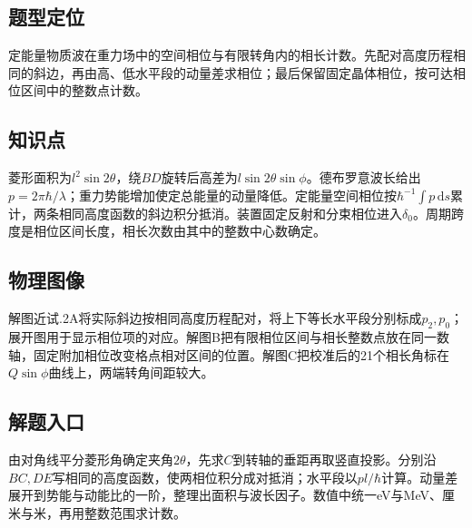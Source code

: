 \documentclass[UTF8,fontset=fandol,a4paper,11pt]{ctexart}
\begin{document}


\subsection*{题型定位}

定能量物质波在重力场中的空间相位与有限转角内的相长计数。先配对高度历程相同的斜边，再由高、低水平段的动量差求相位；最后保留固定晶体相位，按可达相位区间中的整数点计数。



\subsection*{知识点}

菱形面积为$l^2\sin2\theta$，绕$BD$旋转后高差为$l\sin2\theta\sin\phi$。德布罗意波长给出$p=2\pi\hbar/\lambda$；重力势能增加使定总能量的动量降低。定能量空间相位按$\hbar^{-1}\int p\,\mathrm ds$累计，两条相同高度函数的斜边积分抵消。装置固定反射和分束相位进入$\delta_0$。周期跨度是相位区间长度，相长次数由其中的整数中心数确定。



\subsection*{物理图像}

解图近试.2A将实际斜边按相同高度历程配对，将上下等长水平段分别标成$p_2,p_0$；展开图用于显示相位项的对应。解图B把有限相位区间与相长整数点放在同一数轴，固定附加相位改变格点相对区间的位置。解图C把校准后的21个相长角标在$Q\sin\phi$曲线上，两端转角间距较大。



\subsection*{解题入口}

由对角线平分菱形角确定夹角$2\theta$，先求$C$到转轴的垂距再取竖直投影。分别沿$BC,DE$写相同的高度函数，使两相位积分成对抵消；水平段以$pl/\hbar$计算。动量差展开到势能与动能比的一阶，整理出面积与波长因子。数值中统一eV与MeV、厘米与米，再用整数范围求计数。
\end{document}
